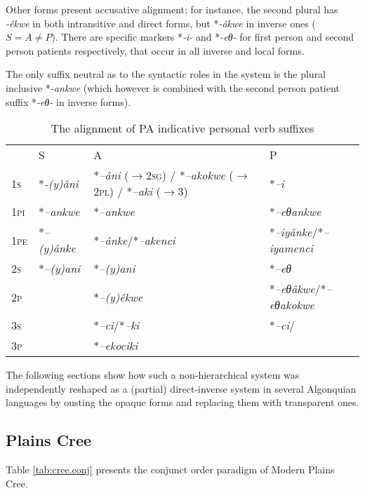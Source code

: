 \documentclass[twoside,a4paper,11pt]{article}
\newcommand{\ipa}[1]{{\phon\textit{#1}}}
\newcommand{\Σ}{\greek{Σ}}
\begin{document}
Other forms present accusative alignment; for instance, the second plural has \ipa{-êkwe} in both intransitive and direct forms, but *\ipa{-âkwe}  in inverse ones ($S = A \ne P$). There are specific markers *\ipa{-i-} and *\ipa{-eθ-} for first person and second person patients respectively, that occur in all inverse and local forms.

The only suffix neutral as to the syntactic roles in the system is the plural inclusive *\ipa{-ankwe} (which however is combined with 
the second person patient suffix *\ipa{-eθ-} in inverse forms).


\begin{table}[H]
\caption{The alignment of PA indicative personal verb suffixes}
\centering \label{tab:protoalg.align}
\begin{tabular}{llll}
\toprule
& S & A & P\\
\textsc{1s} & *\ipa{-(y)âni} & *\ipa{--âni} ($\rightarrow$\textsc{2sg}) / *\ipa{--akokwe} ($\rightarrow$\textsc{2pl}) / *\ipa{--aki} ($\rightarrow$3)& *\ipa{--i}\\
\textsc{1pi} & *\ipa{--ankwe} & *\ipa{--ankwe} & *\ipa{--eθankwe}\\
\textsc{1pe} & *\ipa{--(y)ânke} & *\ipa{--ânke}/*\ipa{--akenci} & *\ipa{--iyânke}/*\ipa{--iyamenci}\\
\midrule
\textsc{2s} & *\ipa{--(y)ani} & *\ipa{--(y)ani} & *\ipa{--eθ}\\
\textsc{2p} & 	& *\ipa{--(y)êkwe} & *\ipa{--eθâkwe}/*\ipa{--eθakokwe}\\
\midrule
\textsc{3s} & 	 & 	*\ipa{--ci}/*\ipa{--ki} & *\ipa{--ci}/\\
\textsc{3p} & 	 & 	*\ipa{--ekociki} & \\
\bottomrule
\end{tabular}
\end{table}


The following sections show how such a non-hierarchical system was independently reshaped as a (partial) direct-inverse system in several Algonquian languages by ousting the opaque forms and replacing them with transparent ones. 
 

\subsection{Plains Cree}
Table \vref{tab:cree.conj} presents the conjunct order paradigm of Modern Plains Cree.
\end{document}
